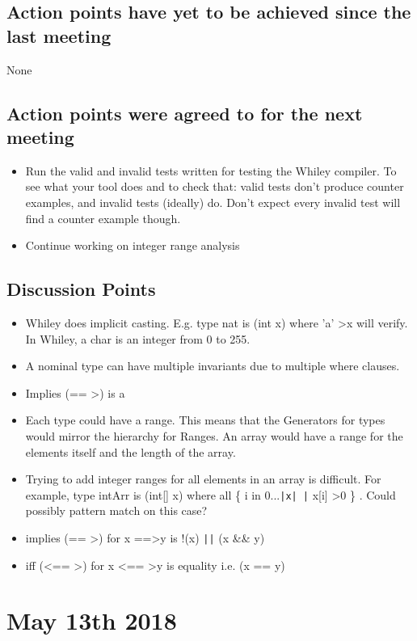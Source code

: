 \documentclass[]{article}
\begin{document}
\subsection{Action points have yet to be achieved since the last meeting}
None
\subsection{Action points were agreed to for the next meeting}
\begin{itemize}
	\item Run the valid and invalid tests written for testing the Whiley compiler.  To see what your tool does and to check that: valid tests don't produce counter examples, and invalid tests (ideally) do.  Don't expect every invalid test will find a counter example though.
	\item Continue working on integer range analysis
\end{itemize}
\subsection{Discussion Points}
\begin{itemize}
 \item Whiley does implicit casting. E.g. type nat is (int x) where 'a' \textgreater x will verify. In Whiley, a char is an integer from 0 to 255.
 \item A nominal type can have multiple invariants due to multiple where clauses.
 \item Implies (== \textgreater) is a 
 
 \item Each type could have a range. This means that the Generators for types would mirror the hierarchy for Ranges. An array would have a range for the elements itself and the length of the array. 
 \item Trying to add integer ranges for all elements in an array is difficult. For example, type intArr is (int[] x) where all \{ i in 0...\texttt{|x| |} x[i] \textgreater 0 \} .  Could possibly pattern match on this case?
 
 \item implies (== \textgreater) for x ==\textgreater y is !(x) \texttt{||} (x \&\& y)
 \item iff (\textless== \textgreater) for x \textless== \textgreater y is equality i.e. (x == y) 
\end{itemize}

\section{May 13th 2018}
\end{document}
